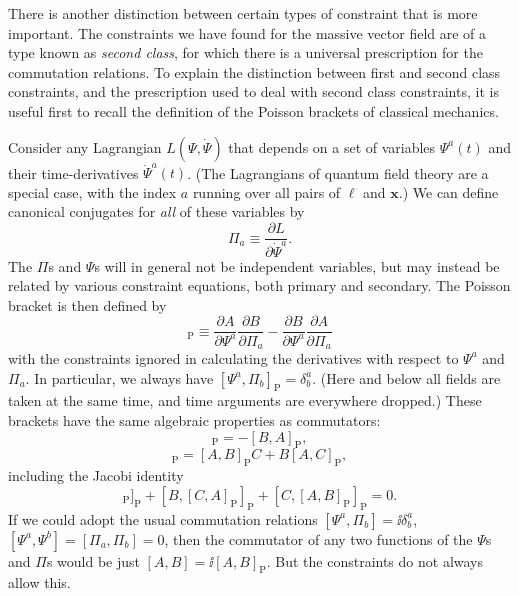 There is another distinction between certain types of constraint that is more
important. The constraints we have found for the massive vector field are of
a type known as \emph{second class}, for which there is a universal
prescription for the commutation relations. To explain the distinction
between first and second class constraints, and the prescription used to deal
with second class constraints, it is useful first to recall the definition of
the Poisson brackets of classical mechanics.

Consider any Lagrangian $L(\Psi,\dot\Psi)$ that depends on a set of variables
$\Psi^a(t)$ and their time-derivatives $\dot\Psi^a(t)$. (The Lagrangians of
quantum field theory are a special case, with the index $a$ running over all
pairs of $\ell$ and $\mathbf x$.) We can define canonical conjugates for
\emph{all} of these variables by
\begin{equation}
\Pi_a\equiv\frac{\partial L}{\partial\dot\Psi^a}.
\tag{7.6.6}\label{eq:7.6.6}
\end{equation}
The $\Pi$s and $\Psi$s will in general not be independent variables, but may
instead be related by various constraint equations, both primary and
secondary. The Poisson bracket is then defined by
\begin{equation}
[A,B]_{\mathrm P}\equiv
\frac{\partial A}{\partial\Psi^a}\frac{\partial B}{\partial\Pi_a}
-\frac{\partial B}{\partial\Psi^a}\frac{\partial A}{\partial\Pi_a}
\tag{7.6.7}\label{eq:7.6.7}
\end{equation}
with the constraints ignored in calculating the derivatives with respect to
$\Psi^a$ and $\Pi_a$. In particular, we always have
$[\Psi^a,\Pi_b]_{\mathrm P}=\delta^a_b$. (Here and below all fields are taken
at the same time, and time arguments are everywhere dropped.) These brackets
have the same algebraic properties as commutators:
\begin{equation}
[A,B]_{\mathrm P}=-[B,A]_{\mathrm P},
\tag{7.6.8}\label{eq:7.6.8}
\end{equation}
\begin{equation}
[A,BC]_{\mathrm P}=[A,B]_{\mathrm P}C+B[A,C]_{\mathrm P},
\tag{7.6.9}\label{eq:7.6.9}
\end{equation}
including the Jacobi identity
\begin{equation}
[A,[B,C]_{\mathrm P}]_{\mathrm P}
+[B,[C,A]_{\mathrm P}]_{\mathrm P}
+[C,[A,B]_{\mathrm P}]_{\mathrm P}=0.
\tag{7.6.10}\label{eq:7.6.10}
\end{equation}
If we could adopt the usual commutation relations
$[\Psi^a,\Pi_b]=\ii\delta^a_b$, $[\Psi^a,\Psi^b]=[\Pi_a,\Pi_b]=0$, then the
commutator of any two functions of the $\Psi$s and $\Pi$s would be just
$[A,B]=\ii[A,B]_{\mathrm P}$. But the constraints do not always allow this.

